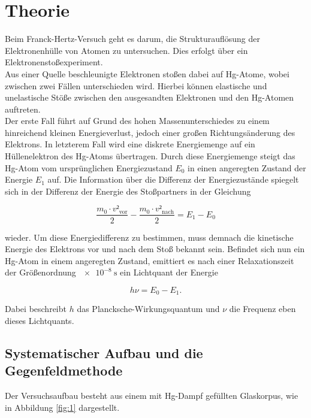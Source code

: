 \section{Theorie}
\label{sec:Theorie}

Beim Franck-Hertz-Versuch geht es darum, die Strukturauflösung der Elektronenhülle von Atomen zu untersuchen.
Dies erfolgt über ein Elektronenstoßexperiment.\\
Aus einer Quelle beschleunigte Elektronen stoßen dabei auf Hg-Atome, wobei zwischen zwei Fällen unterschieden wird.
Hierbei können elastische und unelastische Stöße zwischen den ausgesandten Elektronen und den Hg-Atomen auftreten.\\
Der erste Fall führt auf Grund des hohen Massenunterschiedes zu einem hinreichend kleinen Energieverlust, jedoch einer großen Richtungsänderung des Elektrons.
In letzterem Fall wird eine diskrete Energiemenge auf ein Hüllenelektron des Hg-Atoms übertragen.
Durch diese Energiemenge steigt das Hg-Atom vom ursprünglichen Energiezustand $E_0$ in einen angeregten Zustand der Energie $E_1$ auf.
Die Information über die Differenz der Energiezustände spiegelt sich in der Differenz der Energie des Stoßpartners in der Gleichung

\begin{equation}
\frac{m_0 \cdot v²_{\text{vor}}}{2} - \frac{m_0 \cdot v²_{\text{nach}}}{2} = E_1 - E_0 \label{eqn:1}
\end{equation}

wieder.
Um diese Energiedifferenz zu bestimmen, muss demnach die kinetische Energie des Elektrons vor und nach dem Stoß bekannt sein.
Befindet sich nun ein Hg-Atom in einem angeregten Zustand, emittiert es nach einer Relaxationszeit der Größenordnung $\SI{e-8}{\second}$ ein Lichtquant der Energie

\begin{equation}
  h\nu = E_0 - E_1. \label{eqn:2}
\end{equation}

Dabei beschreibt $h$ das Plancksche-Wirkungsquantum und $\nu$ die Frequenz eben dieses Lichtquants.

\subsection{Systematischer Aufbau und die Gegenfeldmethode}
Der Versuchsaufbau besteht aus einem mit Hg-Dampf gefüllten Glaskorpus, wie in Abbildung \ref{fig:1} dargestellt.

